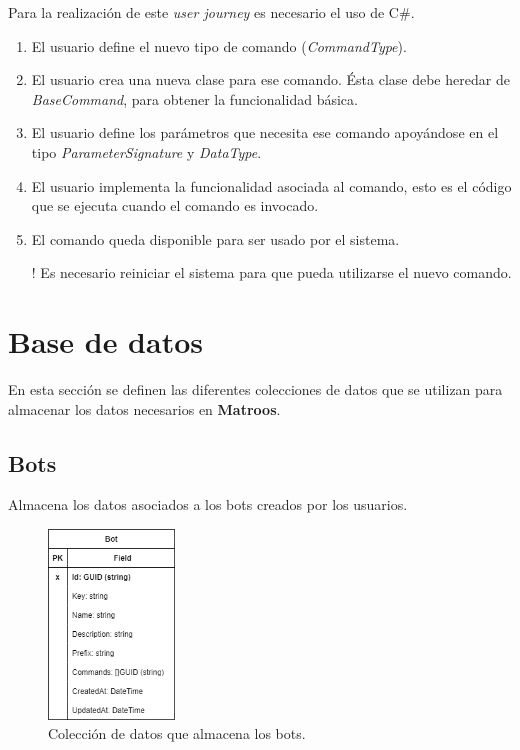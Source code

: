 Para la realización de este \textit{user journey} es necesario el uso de C\#.

\begin{enumerate}
	\item El usuario define el nuevo tipo de comando (\textit{CommandType}).
	\item El usuario crea una nueva clase para ese comando. Ésta clase debe heredar de \textit{BaseCommand}, para obtener la funcionalidad básica.
	\item El usuario define los parámetros que necesita ese comando apoyándose en el tipo \textit{ParameterSignature} y \textit{DataType}.
	\item El usuario implementa la funcionalidad asociada al comando, esto es el código que se ejecuta cuando el comando es invocado.
	\item El comando queda disponible para ser usado por el sistema.
	\item[!] Es necesario reiniciar el sistema para que pueda utilizarse el nuevo comando.
\end{enumerate}


\section{Base de datos}

En esta sección se definen las diferentes colecciones de datos que se utilizan para almacenar los datos necesarios en \textbf{Matroos}.

\subsection{Bots}

Almacena los datos asociados a los bots creados por los usuarios.

\begin{figure}[H]
	\centering
	\includegraphics[width=0.3\textwidth]{img/database_architecture_bot.png}
	\caption{Colección de datos que almacena los bots.}
\end{figure}

